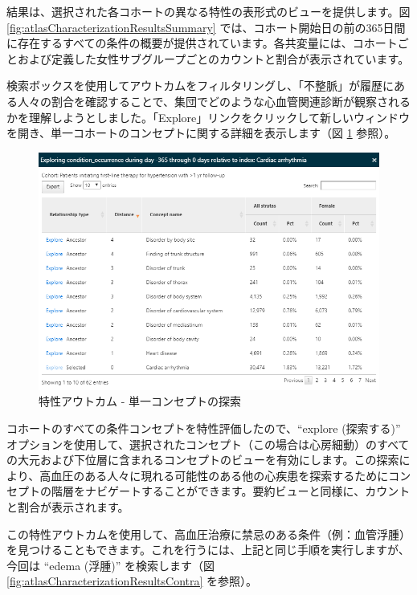 \documentclass[
  11pt]{book}
\theoremstyle{definition}
\theoremstyle{definition}
\theoremstyle{definition}
\theoremstyle{definition}
\theoremstyle{remark}
\begin{document}
結果は、選択された各コホートの異なる特性の表形式のビューを提供します。図 \ref{fig:atlasCharacterizationResultsSummary} では、コホート開始日の前の365日間に存在するすべての条件の概要が提供されています。各共変量には、コホートごとおよび定義した女性サブグループごとのカウントと割合が表示されています。

検索ボックスを使用してアウトカムをフィルタリングし、「不整脈」が履歴にある人々の割合を確認することで、集団でどのような心血管関連診断が観察されるかを理解しようとしました。「Explore」リンクをクリックして新しいウィンドウを開き、単一コホートのコンセプトに関する詳細を表示します（図 \ref{fig:atlasCharacterizationResultsExplore} 参照）。

\begin{figure}

{\centering \includegraphics[width=1\linewidth]{images/Characterization/atlasCharacterizationResultsExplore} 

}

\caption{特性アウトカム - 単一コンセプトの探索}\label{fig:atlasCharacterizationResultsExplore}
\end{figure}

コホートのすべての条件コンセプトを特性評価したので、``explore (探索する)'' オプションを使用して、選択されたコンセプト（この場合は心房細動）のすべての大元および下位層に含まれるコンセプトのビューを有効にします。この探索により、高血圧のある人々に現れる可能性のある他の心疾患を探索するためにコンセプトの階層をナビゲートすることができます。要約ビューと同様に、カウントと割合が表示されます。

この特性アウトカムを使用して、高血圧治療に禁忌のある条件（例：血管浮腫）を見つけることもできます。これを行うには、上記と同じ手順を実行しますが、今回は ``edema (浮腫)'' を検索します（図 \ref{fig:atlasCharacterizationResultsContra} を参照）。
\end{document}
